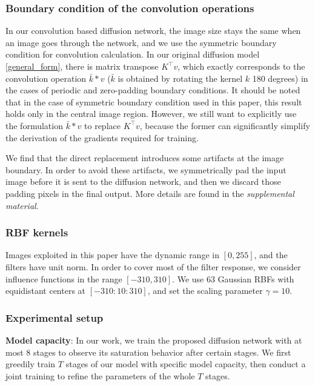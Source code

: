 \documentclass[10pt,journal,compsoc]{IEEEtran}
\begin{document}
\subsubsection{Boundary condition of the convolution operations}
In our convolution based diffusion network, the image size stays 
the same when an image goes through the network, and 
we use the symmetric boundary condition for convolution calculation. 
In our original diffusion model \eqref{general_form}, there is matrix transpose $K^\top v$, which exactly corresponds to 
the convolution operation $\bar k * v$ ($\bar k$ is obtained by 
rotating the kernel $k$ 180 degrees) in the cases of 
periodic and zero-padding boundary conditions. It should be noted that in the case of symmetric boundary condition used in this paper, 
this result holds only in the central image region. 
However, we still want to explicitly use the formulation $\bar k * v$ to replace $K^\top v$, because the former 
can significantly simplify the derivation of the gradients required for training. 

We find that the direct replacement introduces some artifacts at 
the image boundary. In order to avoid these artifacts, 
we symmetrically pad the input image before it is sent to the diffusion network, and then we discard those padding pixels 
in the final output. More details are found in the \textit{supplemental material}. 

\subsubsection{RBF kernels}
Images exploited in this paper have the dynamic range in $[0, 255]$, and 
the filters have unit norm. 
In order to cover most of the filter response, we consider influence functions in the range $[-310, 310]$. We use 
63 Gaussian RBFs with equidistant centers at $[-310: 10: 310]$, and set the scaling parameter $\gamma = 10$. 

\subsubsection{Experimental setup}
\noindent \textbf{Model capacity}: 
In our work, we train the proposed diffusion network with at most 8 
stages to observe its saturation behavior after certain stages. 
We first greedily train $T$ stages of our model with 
specific model capacity, then conduct a joint training to refine 
the parameters of the whole $T$ stages. 
\end{document}
